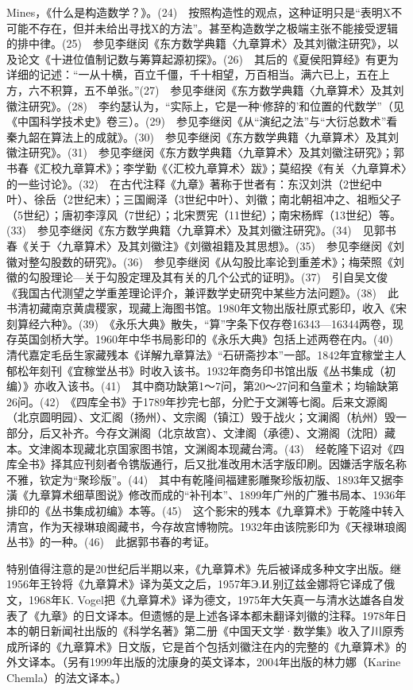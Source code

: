 \documentclass[a4paper,12pt,UTF8,twoside]{ctexbook}
\begin{document}
Mines，《什么是构造数学？》。(24)　按照构造性的观点，这种证明只是“表明X不可能不存在，但并未给出寻找X的方法”。甚至构造数学之极端主张不能接受逻辑的排中律。(25)　参见李继闵《东方数学典籍〈九章算术〉及其刘徽注研究》，以及论文《十进位值制记数与筹算起源初探》。(26)　其后的《夏侯阳算经》有更为详细的记述：“一从十横，百立千僵，千十相望，万百相当。满六已上，五在上方，六不积算，五不单张。”(27)　参见李继闵《东方数学典籍〈九章算术〉及其刘徽注研究》。(28)　李约瑟认为，“实际上，它是一种‘修辞的’和位置的代数学”（见《中国科学技术史》卷三）。(29)　参见李继闵《从“演纪之法”与“大衍总数术”看秦九韶在算法上的成就》。(30)　参见李继闵《东方数学典籍〈九章算术〉及其刘徽注研究》。(31)　参见李继闵《东方数学典籍〈九章算术〉及其刘徽注研究》；郭书春《汇校九章算术》；李学勤《〈汇校九章算术〉跋》；莫绍揆《有关〈九章算术〉的一些讨论》。(32)　在古代注释《九章》著称于世者有：东汉刘洪（2世纪中叶）、徐岳（2世纪末）；三国阚泽（3世纪中叶）、刘徽；南北朝祖冲之、祖暅父子（5世纪）；唐初李淳风（7世纪）；北宋贾宪（11世纪）；南宋杨辉（13世纪）等。(33)　参见李继闵《东方数学典籍〈九章算术〉及其刘徽注研究》。(34)　见郭书春《关于〈九章算术〉及其刘徽注》《刘徽祖籍及其思想》。(35)　参见李继闵《刘徽对整勾股数的研究》。(36)　参见李继闵《从勾股比率论到重差术》；梅荣照《刘徽的勾股理论—关于勾股定理及其有关的几个公式的证明》。(37)　引自吴文俊《我国古代测望之学重差理论评介，兼评数学史研究中某些方法问题》。(38)　此书清初藏南京黄虞稷家，现藏上海图书馆。1980年文物出版社原式影印，收入《宋刻算经六种》。(39)　《永乐大典》散失，“算”字条下仅存卷16343—16344两卷，现存英国剑桥大学。1960年中华书局影印的《永乐大典》包括上述两卷在内。(40)　清代嘉定毛岳生家藏残本《详解九章算法》“石研斋抄本”一部。1842年宜稼堂主人郁松年刻刊《宜稼堂丛书》时收入该书。1932年商务印书馆出版《丛书集成（初编）》亦收入该书。(41)　其中商功缺第1～7问，第20～27问和刍童术；均输缺第26问。(42)　《四库全书》于1789年抄完七部，分贮于文渊等七阁。后来文源阁（北京圆明园）、文汇阁（扬州）、文宗阁（镇江）毁于战火；文澜阁（杭州）毁一部分，后又补齐。今存文渊阁（北京故宫）、文津阁（承德）、文溯阁（沈阳）藏本。文津阁本现藏北京国家图书馆，文渊阁本现藏台湾。(43)　经乾隆下诏对《四库全书》择其应刊刻者令镌版通行，后又批准改用木活字版印刷。因嫌活字版名称不雅，钦定为“聚珍版”。(44)　其中有乾隆间福建影雕聚珍版初版、1893年又据李潢《九章算术细草图说》修改而成的“补刊本”、1899年广州的广雅书局本、1936年排印的《丛书集成初编》本等。(45)　这个影宋的残本《九章算术》于乾隆中转入清宫，作为天禄琳琅阁藏书，今存故宫博物院。1932年由该院影印为《天禄琳琅阁丛书》的一种。(46)　此据郭书春的考证。




特别值得注意的是20世纪后半期以来，《九章算术》先后被译成多种文字出版。继1956年王铃将《九章算术》译为英文之后，1957年Э.И.别辽兹金娜将它译成了俄文，1968年K. Vogel把《九章算术》译为德文，1975年大矢真一与清水达雄各自发表了《九章》的日文译本。但遗憾的是上述各译本都未翻译刘徽的注释。1978年日本的朝日新闻社出版的《科学名著》第二册《中国天文学·数学集》收入了川原秀成所译的《九章算术》日文版，它是首个包括刘徽注在内的完整的《九章算术》的外文译本。（另有1999年出版的沈康身的英文译本，2004年出版的林力娜（Karine Chemla）的法文译本。）
\end{document}
